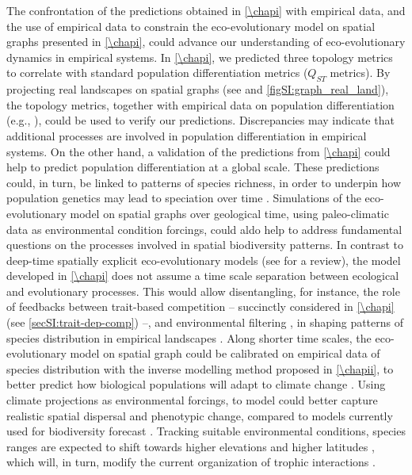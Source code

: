 The confrontation of the predictions obtained in \cref{\chapi} with empirical data, and the use of empirical data to constrain the eco-evolutionary model on spatial graphs presented in \cref{\chapi}, could advance our understanding of eco-evolutionary dynamics in empirical systems.
% 
In \cref{\chapi}, we predicted three topology metrics to correlate with standard population differentiation metrics ($Q_{ST}$ metrics). By projecting real landscapes on spatial graphs (see \cite{Dale2010} and \cref{figSI:graph_real_land}), the topology metrics, together with empirical data on population differentiation (e.g., \cite{Manel2003}), could be used to verify our predictions. Discrepancies may indicate that additional processes are involved in population differentiation in empirical systems. On the other hand, a validation of the predictions from \cref{\chapi} could help to predict population differentiation at a global scale. These predictions could, in turn, be linked to patterns of species richness, in order to underpin how population genetics may lead to speciation over time \citep{Templeton1981}.
% 
Simulations of the eco-evolutionary model on spatial graphs over geological time, using paleo-climatic data \citep{STRAUME2020126} as environmental condition forcings, could aldo help to address fundamental questions on the processes involved in spatial biodiversity patterns. In contrast to deep-time spatially explicit eco-evolutionary models (see \cite{Hagen2022} for a review), the model developed in \cref{\chapi} does not assume a time scale separation between ecological and evolutionary processes.
% 
This would allow disentangling, for instance, the role of feedbacks between trait-based competition \citep{Dieckmann1999} -- succinctly considered in \cref{\chapi} (see \cref{secSI:trait-dep-comp}) --, and environmental filtering \citep{Doebeli2003}, in shaping patterns of species distribution in empirical landscapes \citep{Rahbek2019a}.
% 
Along shorter time scales, the eco-evolutionary model on spatial graph could be calibrated on empirical data of species distribution \citep{Abegg2020,GBIF:TheGlobalBiodiversityInformationFacility2022} with the inverse modelling method proposed in \cref{\chapii}, to better predict how biological populations will adapt to climate change \citep{Norberg2012,Urban2016}. Using climate projections \citep{Kriticos2012} as environmental forcings, to model could better capture realistic spatial dispersal and phenotypic change, compared to models currently used for biodiversity forecast \citep{Pearson2003}.
% 
Tracking suitable environmental conditions, species ranges are expected to shift towards higher elevations and higher latitudes \citep{Chen2011}, which will, in turn, modify the current organization of trophic interactions \citep{Descombes2020}.
